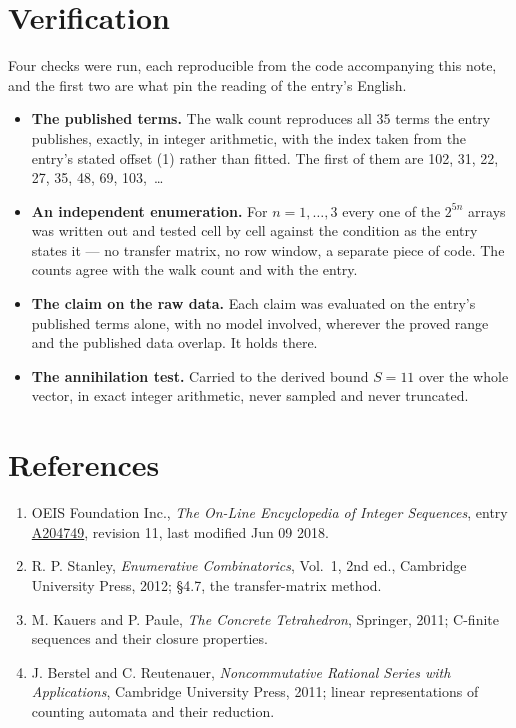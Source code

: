 \documentclass[11pt]{article}
\theoremstyle{definition}
\begin{document}
\section{Verification}

Four checks were run, each reproducible from the code accompanying this note, and the first two are what pin the reading of the entry's English.

\begin{itemize}

\item {\bfseries The published terms.} The walk count reproduces all 35 terms the entry publishes, exactly, in integer arithmetic, with the index taken from the entry's stated offset (1) rather than fitted. The first of them are 102, 31, 22, 27, 35, 48, 69, 103,~\dots

\item {\bfseries An independent enumeration.} For $n = 1,\dots,3$ every one of the $2^{5n}$ arrays was written out and tested cell by cell against the condition as the entry states it --- no transfer matrix, no row window, a separate piece of code. The counts agree with the walk count and with the entry.

\item {\bfseries The claim on the raw data.} Each claim was evaluated on the entry's published terms alone, with no model involved, wherever the proved range and the published data overlap. It holds there.

\item {\bfseries The annihilation test.} Carried to the derived bound $S = 11$ over the whole vector, in exact integer arithmetic, never sampled and never truncated.

\end{itemize}

\section{References}

\begin{enumerate}

\item OEIS Foundation Inc., \emph{The On-Line Encyclopedia of Integer Sequences}, entry \href{https://oeis.org/A204749}{A204749}, revision 11, last modified Jun 09 2018.

\item R. P. Stanley, \emph{Enumerative Combinatorics}, Vol.~1, 2nd ed., Cambridge University Press, 2012; \S4.7, the transfer-matrix method.

\item M. Kauers and P. Paule, \emph{The Concrete Tetrahedron}, Springer, 2011; C-finite sequences and their closure properties.

\item J. Berstel and C. Reutenauer, \emph{Noncommutative Rational Series with Applications}, Cambridge University Press, 2011; linear representations of counting automata and their reduction.

\end{enumerate}
\end{document}
